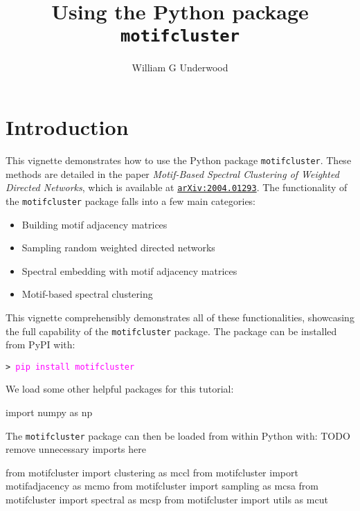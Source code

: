 \documentclass{article}
\title{Using the Python package \texttt{motifcluster}}
\author{William G Underwood}
\begin{document}
\maketitle
\tableofcontents

\pagebreak

\section{Introduction}

This vignette demonstrates how to use the Python package \texttt{motifcluster}.
These methods are detailed in the paper
\textit{Motif-Based Spectral Clustering of Weighted Directed Networks},
which is available at
\href{https://arxiv.org/abs/2004.01293}{\texttt{arXiv:2004.01293}}.
The functionality of the \texttt{motifcluster} package falls into a few main
categories:

\begin{itemize}
\item Building motif adjacency matrices
\item Sampling random weighted directed networks
\item Spectral embedding with motif adjacency matrices
\item Motif-based spectral clustering
\end{itemize}

This vignette comprehensibly demonstrates all of these functionalities,
showcasing the full capability of the \texttt{motifcluster} package. The package
can be installed from PyPI with:

\vspace*{2mm}
\texttt{> \textcolor{Fuchsia}{pip install motifcluster}}
\vspace*{3mm}

We load some other helpful packages for this tutorial:
\begin{pyconsole}
import numpy as np
\end{pyconsole}


The \texttt{motifcluster} package can then be loaded
from within Python with: TODO remove unnecessary imports here

\begin{pyconsole}
from motifcluster import clustering as mccl
from motifcluster import motifadjacency as mcmo
from motifcluster import sampling as mcsa
from motifcluster import spectral as mcsp
from motifcluster import utils as mcut
\end{pyconsole}
\end{document}
